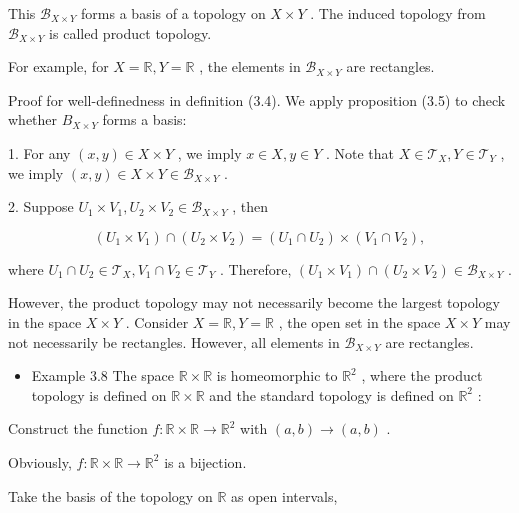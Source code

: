 This \({\mathcal{B}}_{X \times  Y}\) forms a basis of a topology on \(X \times  Y\) . The induced topology from \({\mathcal{B}}_{X \times  Y}\) is called product topology.

For example, for \(X = \mathbb{R},Y = \mathbb{R}\) , the elements in \({\mathcal{B}}_{X \times  Y}\) are rectangles.

Proof for well-definedness in definition (3.4). We apply proposition (3.5) to check whether \({B}_{X \times  Y}\) forms a basis:

1. For any \(\left( {x,y}\right)  \in  X \times  Y\) , we imply \(x \in  X,y \in  Y\) . Note that \(X \in  {\mathcal{T}}_{X},Y \in  {\mathcal{T}}_{Y}\) , we imply \(\left( {x,y}\right)  \in  X \times  Y \in  {\mathcal{B}}_{X \times  Y}\) .

2. Suppose \({U}_{1} \times  {V}_{1},{U}_{2} \times  {V}_{2} \in  {\mathcal{B}}_{X \times  Y}\) , then

\[
\left( {{U}_{1} \times  {V}_{1}}\right)  \cap  \left( {{U}_{2} \times  {V}_{2}}\right)  = \left( {{U}_{1} \cap  {U}_{2}}\right)  \times  \left( {{V}_{1} \cap  {V}_{2}}\right) ,
\]

where \({U}_{1} \cap  {U}_{2} \in  {\mathcal{T}}_{X},{V}_{1} \cap  {V}_{2} \in  {\mathcal{T}}_{Y}\) . Therefore, \(\left( {{U}_{1} \times  {V}_{1}}\right)  \cap  \left( {{U}_{2} \times  {V}_{2}}\right)  \in  {\mathcal{B}}_{X \times  Y}\) .

However, the product topology may not necessarily become the largest topology in the space \(X \times  Y\) . Consider \(X = \mathbb{R},Y = \mathbb{R}\) , the open set in the space \(X \times  Y\) may not necessarily be rectangles. However, all elements in \({\mathcal{B}}_{X \times  Y}\) are rectangles.

\begin{itemize}
\item Example 3.8 The space \(\mathbb{R} \times  \mathbb{R}\) is homeomorphic to \({\mathbb{R}}^{2}\) , where the product topology is defined on \(\mathbb{R} \times  \mathbb{R}\) and the standard topology is defined on \({\mathbb{R}}^{2}\) :
\end{itemize}

Construct the function \(f : \mathbb{R} \times  \mathbb{R} \rightarrow  {\mathbb{R}}^{2}\) with \(\left( {a,b}\right)  \rightarrow  \left( {a,b}\right)\) .

Obviously, \(f : \mathbb{R} \times  \mathbb{R} \rightarrow  {\mathbb{R}}^{2}\) is a bijection.

Take the basis of the topology on \(\mathbb{R}\) as open intervals,

